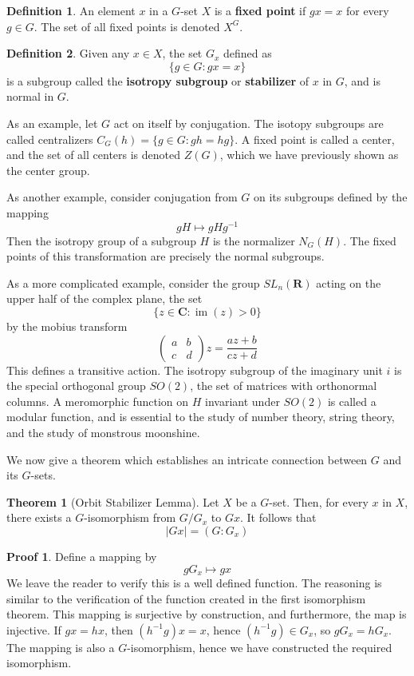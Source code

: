 \documentclass[12pt]{amsbook}
\theoremstyle{definition}
\newtheorem{theorem}{Theorem}[chapter]
\newtheorem{definition}{Definition}
\newtheorem*{prf}{Proof}
\newcommand{\im}{\operatorname{im}} %
\begin{document}
\begin{definition}
    An element $x$ in a $G$-set $X$ is a {\bf fixed point}  if $gx = x$ for every $g \in G$. The set of all fixed points is denoted $X^G$.
\end{definition}

\begin{definition}
    Given any $x \in X$, the set $G_x$ defined as
    \[ \{ g \in G : gx = x \} \]
    is a subgroup called the {\bf isotropy subgroup}  or {\bf stabilizer}  of $x$ in $G$, and is normal in $G$.
\end{definition}

As an example, let $G$ act on itself by conjugation. The isotopy subgroups are called centralizers $C_G(h) = \{ g \in G : gh = hg \}$. A fixed point is called a center, and the set of all centers is denoted $Z(G)$, which we have previously shown as the center group.

As another example, consider conjugation from $G$ on its subgroups defined by the mapping
%
\[ gH \mapsto gHg^{-1} \]
%
Then the isotropy group of a subgroup $H$ is the normalizer $N_G(H)$. The fixed points of this transformation are precisely the normal subgroups.

As a more complicated example, consider the group $SL_n(\mathbf{R})$ acting on the upper half of the complex plane, the set
%
\[ \{ z \in \mathbf{C} : \im(z) > 0 \} \]
%
by the mobius transform
%
\[\begin{pmatrix} a & b \\ c & d \end{pmatrix} z = \frac{az + b}{cz + d}\]
%
This defines a transitive action. The isotropy subgroup of the imaginary unit $i$ is the special orthogonal group $SO(2)$, the set of matrices with orthonormal columns. A meromorphic function on $H$ invariant under $SO(2)$ is called a modular function, and is essential to the study of number theory, string theory, and the study of monstrous moonshine.

We now give a theorem which establishes an intricate connection between $G$ and its $G$-sets.

\begin{theorem} [Orbit Stabilizer Lemma]
    Let $X$ be a $G$-set. Then, for every $x$ in $X$, there exists a $G$-isomorphism from $G/G_x$ to $Gx$. It follows that
    \[ |Gx| = (G:G_x) \]
\end{theorem}
\begin{prf}
    Define a mapping by
    \[ gG_x \mapsto gx \]
    We leave the reader to verify this is a well defined function. The reasoning is similar to the verification of the function created in the first isomorphism theorem. This mapping is surjective by construction, and furthermore, the map is injective. If $gx = hx$, then $(h^{-1}g)x = x$, hence $(h^{-1}g) \in G_x$, so $gG_x = hG_x$. The mapping is also a $G$-isomorphism, hence we have constructed the required isomorphism.
\end{prf}
\end{document}
